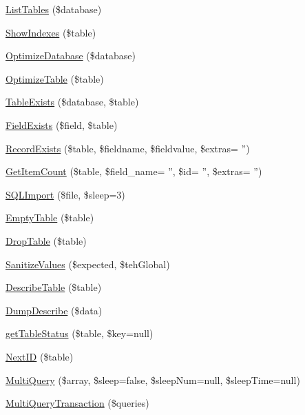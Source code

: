 \begin{DoxyCompactItemize}
\item 
\hyperlink{classdb_p_d_o_a0b1ca1da0e3fdadb229c29f71486c26e}{List\-Tables} (\$database)
\item 
\hyperlink{classdb_p_d_o_a15bee2046e8b15d7728f265eb1621485}{Show\-Indexes} (\$table)
\item 
\hyperlink{classdb_p_d_o_ae9e393a3d4e60be19df990f0beaddaab}{Optimize\-Database} (\$database)
\item 
\hyperlink{classdb_p_d_o_ae8e5b15325e3167666acac5273ec4835}{Optimize\-Table} (\$table)
\item 
\hyperlink{classdb_p_d_o_a8c37ee47f954a63f9ae79633e645a42e}{Table\-Exists} (\$database, \$table)
\item 
\hyperlink{classdb_p_d_o_a095c4f83eff3e2ae70e62f87068e29f5}{Field\-Exists} (\$field, \$table)
\item 
\hyperlink{classdb_p_d_o_a7973975515944e55e52619515c83d264}{Record\-Exists} (\$table, \$fieldname, \$fieldvalue, \$extras= '')
\item 
\hyperlink{classdb_p_d_o_a42e74f8481b5c76fec062a9901889b98}{Get\-Item\-Count} (\$table, \$field\-\_\-name= '', \$id= '', \$extras= '')
\item 
\hyperlink{classdb_p_d_o_a1a3e5b8d48f48b0ff961abd48b7b2cc4}{S\-Q\-L\-Import} (\$file, \$sleep=3)
\item 
\hyperlink{classdb_p_d_o_a155f30fa0b581f7901ca65ff78e4a412}{Empty\-Table} (\$table)
\item 
\hyperlink{classdb_p_d_o_a582880c7d33ddecf23ef0bd4ab094e21}{Drop\-Table} (\$table)
\item 
\hyperlink{classdb_p_d_o_a0466176406e21bf25c58bceff61ac038}{Sanitize\-Values} (\$expected, \$teh\-Global)
\item 
\hyperlink{classdb_p_d_o_adedb766b7d1e207120f646511060653f}{Describe\-Table} (\$table)
\item 
\hyperlink{classdb_p_d_o_ab0be4258c0386d6adc32394969b28faf}{Dump\-Describe} (\$data)
\item 
\hyperlink{classdb_p_d_o_a423b4500f65e4d8e0178081d8e40d587}{get\-Table\-Status} (\$table, \$key=null)
\item 
\hyperlink{classdb_p_d_o_aac90a12617acd0c0e029578edcdb2d4b}{Next\-I\-D} (\$table)
\item 
\hyperlink{classdb_p_d_o_a575dfedc21a3fa227430424864b2110c}{Multi\-Query} (\$array, \$sleep=false, \$sleep\-Num=null, \$sleep\-Time=null)
\item 
\hyperlink{classdb_p_d_o_ae6869777ce31414a8cb23a4e48dad288}{Multi\-Query\-Transaction} (\$queries)

\end{DoxyCompactItemize}
